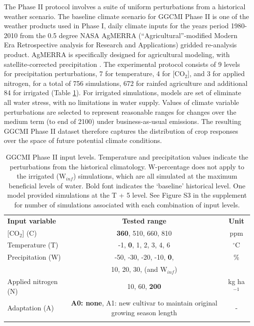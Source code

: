 \documentclass[gmd, manuscript]{copernicus} %
\begin{document}
The Phase II protocol involves a suite of uniform perturbations from a historical weather scenario. 
The baseline climate scenario for GGCMI Phase II is one of the weather products used in Phase I, daily climate inputs for the years period 1980-2010 from the 0.5 degree NASA AgMERRA (``Agricultural''-modified Modern Era Retrospective analysis for Research and Applications) gridded re-analysis product. AgMERRA is specifically designed for agricultural modeling, with satellite-corrected precipitation \citep{Ruane2015}. 
The experimental protocol consists of 9 levels for precipitation perturbations, 7 for temperature, 4 for [CO$_2$], and 3 for applied nitrogen, for a total of 756 simulations, 672 for rainfed agriculture and additional 84 for irrigated (Table \ref{table:inputs}).  For irrigated simulations, models are set of eliminate all water stress, with no limitations in water supply. 
Values of climate variable perturbations are selected to represent reasonable ranges for changes over the medium term (to end of 2100) under business-as-usual emissions. 
The resulting GGCMI Phase II dataset therefore captures the distribution of crop responses over the space of future potential climate conditions.


\begin{table}[t]
\caption{GGCMI Phase II input levels. Temperature and precipitation values indicate the perturbations from the historical climatology. W-percentage does not apply to the irrigated (W$_{inf}$) simulations, which are all simulated at the maximum beneficial levels of water. Bold font indicates the `baseline' historical level. One model provided simulations at the T + 5 level. See Figure S3 in the supplement for number of simulations associated with each combination of input levels.}
\label{table:inputs} 
    \begin{tabular}{lcc} 
        \tophline \vspace{1mm}
        \textbf{Input variable} & \textbf{Tested range} & \textbf{Unit} \\ \middlehline \vspace{1mm}
        [CO$_2$] (C) & \textbf{360}, 510, 660, 810 & ppm\\ \middlehline \vspace{1mm}
        Temperature (T) & -1, \textbf{0}, 1, 2, 3, 4, 6 & $^{\circ}$C\\ \middlehline \vspace{1mm}
        Precipitation (W) & -50, -30, -20, -10, \textbf{0}, & \% \\
        {} & 10, 20, 30, (and W$_{inf}$) & {} \\ \middlehline \vspace{1mm}
        Applied nitrogen (N) & 10, 60, \textbf{200} & kg ha$^{-1}$ \\ \middlehline \vspace{1mm}
        Adaptation (A) & \textbf{A0: none}, A1: new cultivar to maintain original growing season length & -\\ \bottomhline
    \end{tabular}\\
\end{table}
\end{document}
